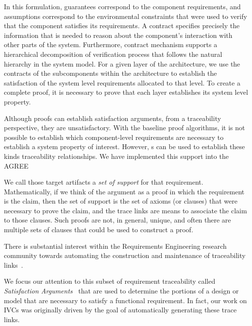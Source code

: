 In this formulation, guarantees correspond to the component requirements, and assumptions correspond to the environmental constraints that were used to verify that the component satisfies its requirements.  A contract specifies precisely the information that is needed to reason about the component’s interaction with other parts of the system. Furthermore, contract mechanism supports a hierarchical decomposition of verification process that follows the natural hierarchy in the system model.  For a given layer of the architecture, we use the contracts of the subcomponents within the architecture to establish the satisfaction of the system level requirements allocated to that level.  To create a complete proof, it is necessary to prove that each layer  establishes its system level property.

Although proofs can establish satisfaction arguments, from a traceability perspective, they are unsatisfactory.  With the baseline proof algorithms, it is not possible to establish which component-level requirements are necessary to establish a system property of interest.  However, \mivc s can be used to establish these kinds traceability relationships.  We have implemented this support into the AGREE
\fi


\iffalse


We call those target artifacts a \emph{set of support} for that requirement. Mathematically, if we think of the argument as a proof in which the requirement is the claim, then the set of support is the set of axioms (or clauses) that were necessary to prove the claim, and the trace links are means to associate the claim to those clauses. Such proofs are not, in general, unique, and often there are multiple sets of clauses that could be used to construct a proof.

There is substantial interest within the Requirements Engineering research community towards automating the construction and maintenance of traceability links~\cite{hayes2003improving, egyed2002automating,cleland2007best}.
%
%

We focus our attention to this subset of requirement traceability called {\em Satisfaction Arguments}~\cite{Hammond01:WiW} that are used to determine the portions of a design or model that are necessary to satisfy a functional requirement.
In fact, our work on IVCs was originally driven by the goal of automatically generating these trace links.

